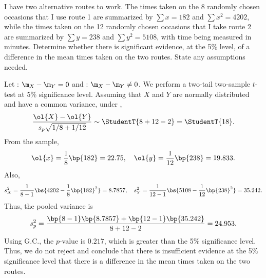 \begin{problem}
    I have two alternative routes to work. The times taken on the 8 randomly chosen occasions that I use route 1 are summarized by $\sum x=182$ and $\sum x^{2}=4202$, while the times taken on the 12 randomly chosen occasions that I take route 2 are summarized by $\sum y=238$ and $\sum y^{2}=5108$, with time being measured in minutes. Determine whether there is significant evidence, at the 5\% level, of a difference in the mean times taken on the two routes. State any assumptions needed.
\end{problem}
\begin{solution}
    Let \nullhyp: $\m_X - \m_Y = 0$ and \althyp: $\m_X - \m_Y \neq 0$. We perform a two-tail two-sample $t$-test at 5\% significance level. Assuming that $X$ and $Y$ are normally distributed and have a common variance, under \nullhyp, \[\frac{\ol{X} - \ol{Y}}{s_p \sqrt{1/8 + 1/12}} \sim \StudentT{8 + 12 - 2} = \StudentT{18}.\] From the sample, \[\ol{x} = \frac18 \bp{182} = 22.75, \quad \ol{y} = \frac1{12} \bp{238} = 19.833.\] Also, \[s_X^2 = \frac1{8-1}\bs{4202 - \frac18 \bp{182}^2} = 8.7857, \quad s_Y^2 = \frac1{12-1} \bs{5108 - \frac1{12} \bp{238}^2} = 35.242.\] Thus, the pooled variance is \[s_p^2 = \frac{\bp{8-1} \bp{8.7857} + \bp{12 - 1} \bp{35.242}}{8 + 12 - 2} = 24.953.\] Using G.C., the $p$-value is $0.217$, which is greater than the 5\% significance level. Thus, we do not reject \nullhyp{} and conclude that there is insufficient evidence at the 5\% significance level that there is a difference in the mean times taken on the two routes.
\end{solution}

